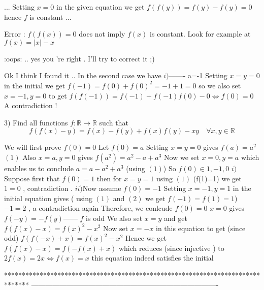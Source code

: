 \begin{solution}
	\begin{tcolorbox}...
Setting  $x=0$ in the given equation we get $f(f(y))=f(y)-f(y)=0$ hence $f$ is constant
...
\end{tcolorbox}
Error : $f(f(x))=0$ does not imply $f(x)$ is constant. Look for example at $f(x)=|x|-x$
\end{solution}



\begin{solution}
	:oops: .. yes you 're right . I'll try to correct it ;)
\end{solution}



\begin{solution}
	Ok I think I found it ..
In the second case we have 
$i)$------- a=-1
Setting $x=y=0$ in the initial we get  $f(-1)=f(0) +f(0)^2 =-1+1=0$
so we also set $x=-1,y=0$ to get $f(f(-1))=f(-1)+f(-1)f(0)-0\Leftrightarrow f(0)=0 $
A contradiction !
\end{solution}



\begin{solution}
	\begin{tcolorbox}

3) Find all functions $f:\mathbb{R}\to\mathbb{R}$ such that
\[f(f(x)-y)=f(x)-f(y)+f(x)f(y)-xy  \quad \forall x,y\in\mathbb{R}\]\end{tcolorbox}
We will first prove $f(0)=0$
Let $f(0)=a$
Setting $x=y=0$ gives $f(a)=a^{2}$ $(1)$
Also $x=a,y=0$ gives $f(a^{2})=a^{2}-a+a^{3}$
Now we set $x=0 ,y=a$ which enables us to conclude $a=a-a^{2}+a^{3} $ (using $(1)$)
So $f(0)\in {1,-1,0}$
$i)$Suppose first that $f(0)=1$
then for $x=y=1$ using $(1)$ (f(1)=1) we get  $1=0$ , contradiction .
$ii)$Now assume $f(0)=-1$ 
Setting $x=-1,y=1$ in the initial equation gives ( using $(1)$ and $(2)$ we get $f(-1)=f(1)=1$)
$-1=2 $ , a contradiction again 
Therefore, we conlcude $f(0)=0$
$x=0$ gives $f(-y)=-f(y)$------ $f$ is odd 
We also set $x=y$ and get $f( f(x)-x)=f(x)^{2}-x^{2}$
Now set $x=-x$ in this equation to get (since odd)  $f(f(-x)+x)=f(x)^{2}-x^{2}$
Hence we get $f(f(x)-x)=f(-f(x)+x)$ which reduces (since injective ) to $2f(x)=2x\Leftrightarrow f(x)=x$
this equation indeed satisfies the initial
\end{solution}
*******************************************************************************
-------------------------------------------------------------------------------

